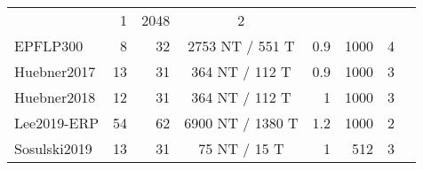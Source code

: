 \begin{tabularx}{\linewidth}{@{}Xrrcrrrr@{}}
                   &1&2048& 2                          &                                          \\
               EPFLP300       & 8                          & 32          & 2753 NT / 551 T
                   &0.9&1000& 4                          &                                          \\
               Huebner2017    & 13                         & 31          & 364 NT / 112 T
                   &0.9&1000& 3                          &                                          \\
               Huebner2018    & 12                         & 31          & 364 NT / 112 T
                   &1&1000& 3                          &                                          \\
               Lee2019-ERP   & 54                         & 62          & 6900 NT / 1380
    T         &1.2&1000& 2                          &                                          \\
               Sosulski2019   & 13                         & 31          & 75 NT / 15 T
                   &1&512& 3                          &                                          \\ \bottomrule
       \end{tabularx}
